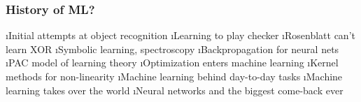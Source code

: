 \documentclass{beamer}
\begin{document}
\begin{frame}
\frametitle{History of ML?}

\bei
\i Initial attempts at object recognition 
\i Learning to play checker 
\i Rosenblatt can't learn XOR 
\i Symbolic learning, spectroscopy 
\i Backpropagation for neural nets 
\i PAC model of learning theory 
\i Optimization enters machine learning 
\i Kernel methods for non-linearity 
\i Machine learning behind day-to-day tasks 
\i Machine learning takes over the world 
\i Neural networks and the biggest come-back ever 
\eni
\end{frame}
\end{document}

